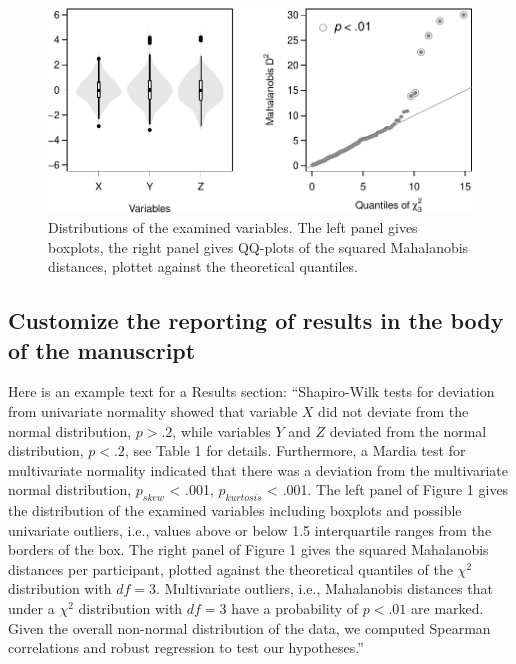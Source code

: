 \documentclass[
]{article}
\begin{document}
\begin{figure}[bt]

{\centering \includegraphics{RM_03_KeepingCalm_files/figure-latex/analysis.1-1} 

}

\caption{Distributions of the examined variables. The left panel gives boxplots, the right panel gives QQ-plots of the squared Mahalanobis distances, plottet against the theoretical quantiles.}\label{fig:analysis.1}
\end{figure}

\hypertarget{customize-the-reporting-of-results-in-the-body-of-the-manuscript}{%
\subsection{Customize the reporting of results in the body of the
manuscript}\label{customize-the-reporting-of-results-in-the-body-of-the-manuscript}}

Here is an example text for a Results section: ``Shapiro-Wilk tests for
deviation from univariate normality showed that variable \(X\) did not
deviate from the normal distribution, \(p>.2\), while variables \(Y\)
and \(Z\) deviated from the normal distribution, \(p<.2\), see Table 1
for details. Furthermore, a Mardia test for multivariate normality
indicated that there was a deviation from the multivariate normal
distribution, \(p_{skew}\) \textless{} .001, \(p_{kurtosis}\)
\textless{} .001. The left panel of Figure 1 gives the distribution of
the examined variables including boxplots and possible univariate
outliers, i.e., values above or below 1.5 interquartile ranges from the
borders of the box. The right panel of Figure 1 gives the squared
Mahalanobis distances per participant, plotted against the theoretical
quantiles of the \(\chi^2\) distribution with \(df=3\). Multivariate
outliers, i.e., Mahalanobis distances that under a \(\chi^2\)
distribution with \(df=3\) have a probability of \(p<.01\) are marked.
Given the overall non-normal distribution of the data, we computed
Spearman correlations and robust regression to test our hypotheses.''
\end{document}
